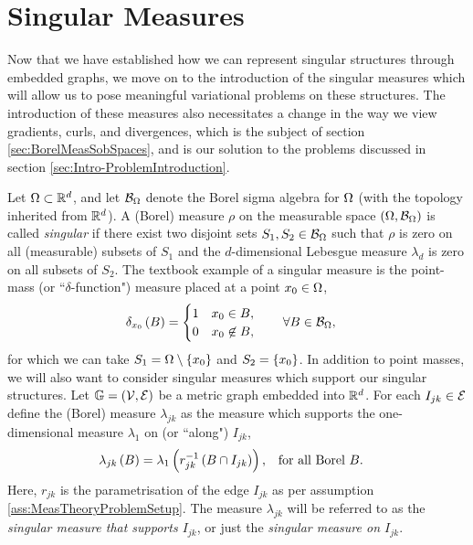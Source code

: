 \section{Singular Measures} \label{sec:SingularMeasures}
Now that we have established how we can represent singular structures through embedded graphs, we move on to the introduction of the singular measures which will allow us to pose meaningful variational problems on these structures.
The introduction of these measures also necessitates a change in the way we view gradients, curls, and divergences, which is the subject of section \ref{sec:BorelMeasSobSpaces}, and is our solution to the problems discussed in section \ref{sec:Intro-ProblemIntroduction}.

Let $\Omega\subset\mathbb{R}^d$, and let $\mathcal{B}_{\Omega}$ denote the Borel sigma algebra for $\Omega$ (with the topology inherited from $\mathbb{R}^d$).
A (Borel) measure $\rho$ on the measurable space $\left( \Omega,\mathcal{B}_{\Omega} \right)$ is called \emph{singular} if there exist two disjoint sets $S_1,S_2\in \mathcal{B}_{\Omega}$ such that $\rho$ is zero on all (measurable) subsets of $S_1$ and the $d$-dimensional Lebesgue measure $\lambda_d$ is zero on all subsets of $S_2$.
The textbook example of a singular measure is the point-mass (or ``$\delta$-function") measure placed at a point $x_0\in\Omega$,
\begin{align*}
	\delta_{x_0}\left( B \right) &= \begin{cases} 1 & x_0\in B, \\ 0 & x_0\not\in B, \end{cases}
	\qquad \forall B\in\mathcal{B}_{\Omega},
\end{align*}
for which we can take $S_1=\Omega\setminus\left\{ x_0 \right\}$ and $S_2=\left\{ x_0 \right\}$.
In addition to point masses, we will also want to consider singular measures which support our singular structures.
Let $\mathbb{G}=\left( \mathcal{V}, \mathcal{E} \right)$ be a metric graph embedded into $\mathbb{R}^d$.
For each $I_{jk}\in\mathcal{E}$ define the (Borel) measure $\lambda_{jk}$ as the measure which supports the one-dimensional measure $\lambda_1$ on (or ``along") $I_{jk}$,
\begin{align*}
	\lambda_{jk}\left( B \right) = \lambda_{1}\left( r_{jk}^{-1}\left( B \cap I_{jk} \right) \right),
	&\quad\text{for all Borel } B.
\end{align*}
Here, $r_{jk}$ is the parametrisation of the edge $I_{jk}$ as per assumption \ref{ass:MeasTheoryProblemSetup}.
The measure $\lambda_{jk}$ will be referred to as the \emph{singular measure that supports $I_{jk}$}, or just the \emph{singular measure on $I_{jk}$}.

